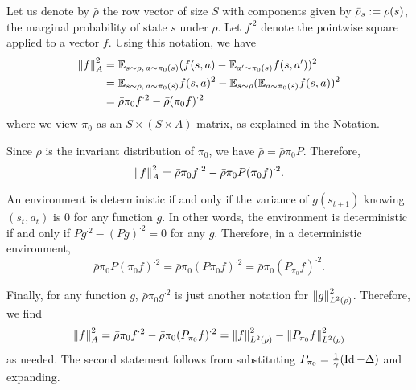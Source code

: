 \documentclass[11pt,a4paper]{article}
\begin{document}
\begin{dem}
Let us denote by $\bar \rho$ the row vector of size $S$ with components
given by $\bar \rho_s\mathrel{\mathop{:}}=\rho(s)$, the marginal probability of state $s$
under $\rho$. Let $f^{\cdot 2}$ denote the pointwise square applied to a vector
$f$. Using this notation, we have
\begin{align}
\left\lVert f\right\rVert^2_A&=
\mathbb{E}_{s\sim \rho,\,a\sim \pi_0(s)} (f(s,a)-\mathbb{E}_{a'\sim \pi_0(s)} f(s,a'))^2
\\&=
\mathbb{E}_{s\sim \rho,\,a\sim \pi_0(s)} f(s,a)^2 - \mathbb{E}_{s\sim \rho} (\mathbb{E}_{a\sim
\pi_0(s)} f(s,a))^2
\\&= \bar\rho \pi_0 f^{\cdot 2}-\bar\rho(\pi_0 f)^{\cdot 2}
\end{align}
where we view $\pi_0$ as an $S\times (S\times A)$ matrix, as explained in
the Notation.

Since $\rho$ is the invariant distribution of $\pi_0$, we have $\bar
\rho=\bar \rho \pi_0 P$. Therefore,
\begin{equation}
\left\lVert f\right\rVert^2_A=\bar\rho \pi_0 f^{\cdot 2}-\bar\rho \pi_0 P (\pi_0 f)^{\cdot
2}.
\end{equation}

An environment is deterministic if and only if the variance of
$g(s_{t+1})$ knowing $(s_t,a_t)$ is $0$ for any function $g$. In other
words, the environment is deterministic if and only if $Pg^{\cdot
2}-(Pg)^{\cdot 2}=0$ for any $g$. Therefore, in a deterministic
environment,
\begin{equation}
\bar\rho \pi_0 P (\pi_0 f)^{\cdot 2}=\bar\rho \pi_0 (P\pi_0 f)^{\cdot 2}
=\bar\rho \pi_0 (P_{\pi_0} f)^{\cdot 2}.
\end{equation}

Finally, for any function $g$, $\bar\rho\pi_0 g^{\cdot 2}$ is just
another notation for $\left\lVert g\right\rVert^2_{L^2(\rho)}$. Therefore, we find
\begin{equation}
\left\lVert f\right\rVert^2_A=\bar\rho \pi_0 f^{\cdot 2}-\bar\rho\pi_0 (P_{\pi_0}f)^{\cdot
2}=\left\lVert f\right\rVert^2_{L^2(\rho)}-\left\lVert P_{\pi_0}f\right\rVert^2_{L^2(\rho)}
\end{equation}
as needed.
The second statement follows from substituting
$P_{\pi_0}=\frac{1}{\gamma}(\operatorname{Id}-\Delta)$ and expanding.
\end{dem}
\end{document}
